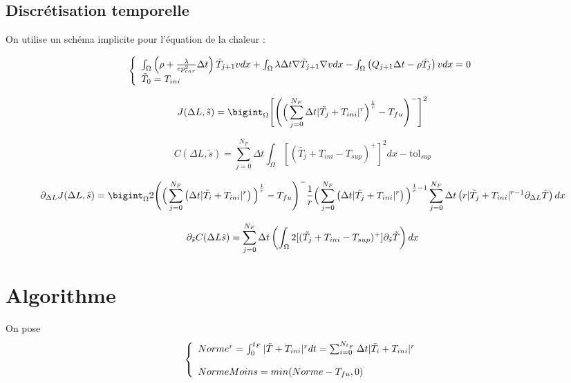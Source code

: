 \documentclass[11pt,a4paper]{article}
\begin{document}
\subsection*{Discrétisation temporelle}

On utilise un schéma implicite pour l'équation de la chaleur :

\begin{equation}
\left\{\begin{array}{l}
	\int_{\Omega} \left(\rho+\frac{\lambda}{ep^2_{car}}\Delta t\right)\tilde{T}_{j+1}vdx+\int_{\Omega} \lambda\Delta t \nabla\tilde{T}_{j+1}\nabla vdx-\int_{\Omega}\left(Q_{j+1}\Delta t-\rho\tilde{T}_j\right)vdx=0 \\
	\tilde{T}_0=T_{ini}
\end{array}\right.
\end{equation}

\begin{equation}
J(\Delta L,\tilde{s})=\bigint_{\Omega}\Bigg[\Bigg(\Big(\sum_{j=0}^{N_F}\Delta t|\tilde{T_j}+T_{ini}|^r\Big)^{\frac{1}{r}}-T_{fu}\Bigg)^-\Bigg]^2 
\end{equation}


\begin{equation}
C(\Delta L,\tilde{s})=\sum_{j=0}^{N_F}\Delta t\int_{\Omega}[(\tilde{T_j}+T_{ini}-T_{sup})^+]^2dx-\textrm{tol}_{sup}
\end{equation}

\begin{equation}
\partial_{\Delta L}J(\Delta L,\stilde)= \bigint_{\Omega}2\Bigg(\Big(\sum_{j=0}^{N_F}\left(\Delta t|\tilde{T_i}+T_{ini}|^r\right)\Big)^{\frac{1}{r}}-T_{fu}\Bigg)^-\frac{1}{r}\Big(\sum_{j=0}^{N_F}\left(\Delta t|\tilde{T_j}+T_{ini}|^r\right)\Big)^{\frac{1}{r}-1}\sum_{j=0}^{N_F}\Delta t\left(r|\tilde{T_j}+T_{ini}|^{r-1}\partial_{\Delta L} \tilde{T}\right)dx 
\end{equation}

\begin{equation}
\partial_{\tilde{s}}C(\Delta L\tilde{s})= \sum_{j=0}^{N_F}\Delta t\left(\int_{\Omega}2[(\tilde{T_j}+T_{ini}-T_{sup})^+]\partial_{\tilde{s}} \tilde{T}\right)dx
\end{equation}


\section*{Algorithme}
On pose 
\begin{equation}
\left\{\begin{array}{l}
	Norme^r=\int_{0}^{t_F}|\tilde{T}+T_{ini}|^rdt=\sum_{i=0}^{N_{t_F}}\Delta t |\tilde{T}_i+T_{ini}|^r \\
	\\
	NormeMoins=min(Norme-T_{fu},0) \\	
	\end{array}\right.
\end{equation}
\end{document}
